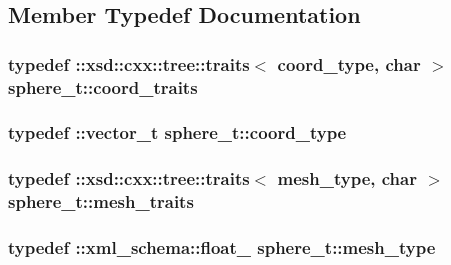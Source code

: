 \subsection{Member Typedef Documentation}
\subsubsection[{\texorpdfstring{coord\+\_\+traits}{coord_traits}}]{\setlength{\rightskip}{0pt plus 5cm}typedef \+::xsd\+::cxx\+::tree\+::traits$<$ {\bf coord\+\_\+type}, char $>$ {\bf sphere\+\_\+t\+::coord\+\_\+traits}}\hypertarget{classsphere__t_a87077ccc12086ff4174bcce04de71df7}{}\label{classsphere__t_a87077ccc12086ff4174bcce04de71df7}
\subsubsection[{\texorpdfstring{coord\+\_\+type}{coord_type}}]{\setlength{\rightskip}{0pt plus 5cm}typedef \+::{\bf vector\+\_\+t} {\bf sphere\+\_\+t\+::coord\+\_\+type}}\hypertarget{classsphere__t_a60b541b054e6695017e6468b51a89efd}{}\label{classsphere__t_a60b541b054e6695017e6468b51a89efd}
\subsubsection[{\texorpdfstring{mesh\+\_\+traits}{mesh_traits}}]{\setlength{\rightskip}{0pt plus 5cm}typedef \+::xsd\+::cxx\+::tree\+::traits$<$ {\bf mesh\+\_\+type}, char $>$ {\bf sphere\+\_\+t\+::mesh\+\_\+traits}}\hypertarget{classsphere__t_ab459645510e9f8a3a0415beb6d1ce3cd}{}\label{classsphere__t_ab459645510e9f8a3a0415beb6d1ce3cd}
\subsubsection[{\texorpdfstring{mesh\+\_\+type}{mesh_type}}]{\setlength{\rightskip}{0pt plus 5cm}typedef \+::{\bf xml\+\_\+schema\+::float\+\_\+} {\bf sphere\+\_\+t\+::mesh\+\_\+type}}\hypertarget{classsphere__t_af7cb7f854954b484b72bbed0516e223a}{}\label{classsphere__t_af7cb7f854954b484b72bbed0516e223a}
